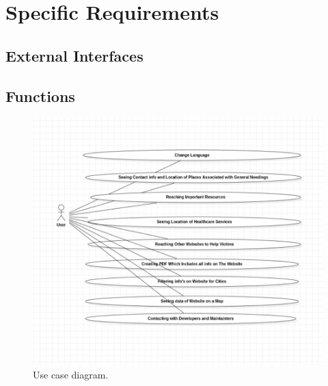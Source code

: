 \chapter{Specific Requirements}

\section{External Interfaces}

\section{Functions}
\begin{figure}[H]
    \includegraphics[scale=0.5]{assets/UseCaseDiagram.png}
    \caption[Use Case Diagram]{Use case diagram.}
\end{figure}

